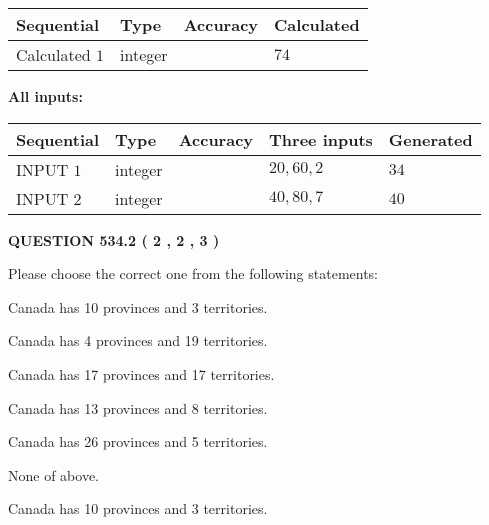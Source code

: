 \documentclass[12pt]{article}
\begin{document}
   
  
  
\noindent\begin{tabular}{|l|l|l|l|}
\hline
 Sequential & Type & Accuracy & Calculated \\ 
\hline
 
 
  Calculated $  1 $ & integer &  & 
  $ 74 $ 
 \\  \hline  
 \end{tabular}
   
   
   
   
\noindent\vspace{0.1in}\hspace{-0.08in} {\textbf{\Large{All inputs: }}}
   
   
  
  
\noindent\begin{tabular}{|l|l|l|l|l|}
\hline
 Sequential & Type & Accuracy & Three inputs & Generated \\ 
\hline
 
 
  INPUT $  1 $ & integer &  & $
 20
 , 
 60
 , 
 2
 $ & $ 34 $ 
 \\  \hline  
 
 
  INPUT $  2 $ & integer &  & $
 40
 , 
 80
 , 
 7
 $ & $ 40 $ 
 \\  \hline  
 \end{tabular}
   
   
  
\vspace{0.2in}
  
{\textbf{\Large{QUESTION
534.2 
 ( 2 , 2 , 3 )
}}}
  
  
Please choose the correct one from the following statements:
 
 
Canada has 10  provinces and 3 territories.
 
 
Canada has   4 provinces and  19 territories.
 
 
Canada has  17 provinces and  17 territories.
 
 
Canada has  13 provinces and  8 territories.
 
 
Canada has  26 provinces and  5 territories.
 
 
 None of above.
 
 
\noindent{}
 
 
Canada has 10  provinces and 3 territories.
 
\end{document}
